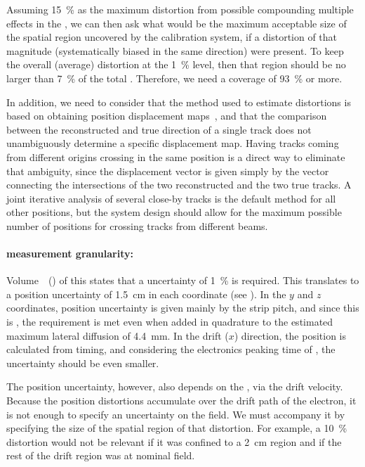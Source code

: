 Assuming \SI{15}{\%} as the maximum \efield distortion from possible compounding multiple  effects in the  ,
we can then ask what would be the maximum acceptable size of the spatial region uncovered by the calibration system, if a distortion of that magnitude (systematically biased in the same direction) were present. To keep the overall (average) \efield distortion at the \SI{1}{\%} level, then that region should be no larger than \SI{7}{\%} of the total . Therefore, we need a coverage of \SI{93}{\%} or more.

In addition, we need to consider that the method used to estimate \efield distortions is based on obtaining position displacement maps~\cite{bib:uBlaser2019}, and that the comparison between the reconstructed and true direction of a single track does not %
unambiguously determine a specific displacement map. Having tracks coming from different origins crossing in the same position is a direct way to eliminate that ambiguity, since the displacement vector is given simply by the vector connecting the intersections of the two reconstructed and the two true tracks. A joint iterative analysis of several close-by tracks is the default method for all other positions, but the system design should allow for the maximum possible number of positions %
for crossing tracks from different beams.


\paragraph{\efield measurement granularity:}

Volume~\volnumberphysics~(\voltitlephysics) of this  states that a  uncertainty of \SI{1}{\%} is required. 
This translates to a position uncertainty of \SI{1.5}{\cm} in each coordinate (see  \spchapa). 
In the $y$ and $z$ coordinates, position uncertainty is given mainly by the  strip pitch, and since this is \dpstrippitch, the requirement is met even when added in quadrature to the estimated maximum lateral diffusion of \SI{4.4}{\milli\m}. In the drift ($x$) direction, the position is calculated from timing, and considering the electronics peaking time of \fepeaktime, the uncertainty should be even smaller.

The position uncertainty, however, also depends on the \efield, via the drift velocity. Because the position distortions accumulate over the drift path of the electron, it is not enough to specify an uncertainty on the field. We must accompany it by specifying the size of the spatial region of that distortion. For example, a \SI{10}{\%} distortion would not be relevant if it was confined to a \SI{2}{\cm} region and if the rest of the drift region was at nominal field.


